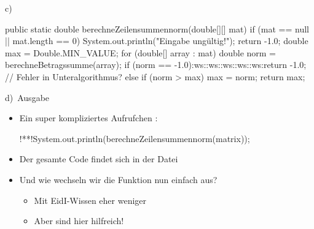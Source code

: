 \begin{frame}[fragile,c]{c)~}
\begin{plainjava}[lineskip=2pt]
public static double berechneZeilensummennorm(double[][] mat) {
    if (mat == null || mat.length == 0) {
        System.out.println("Eingabe ungültig!");
        return -1.0;
    }
    double max = Double.MIN_VALUE;
    for (double[] array : mat) {
        double norm = berechneBetragssumme(array);
        if (norm == -1.0):ws::ws::ws::ws::ws:return -1.0; // Fehler in Unteralgorithmus?
        else if (norm > max) max = norm;
    }
    return max;
}
\end{plainjava}
\end{frame}

\begin{frame}[fragile]{d)~Ausgabe}
\begin{itemize}[<+(1)->]
    \itemsep8pt
    \item Ein super kompliziertes Aufrufchen :
\begin{plainjava}[aboveskip=0pt]
!**!System.out.println(berechneZeilensummennorm(matrix));
\end{plainjava}
    \item<4-> Der gesamte Code findet sich in der Datei 
    \item Und wie wechseln wir die Funktion nun einfach aus? \begin{itemize}
        \item Mit EidI-Wissen eher weniger
        \item Aber  sind hier hilfreich!
    \end{itemize}
\end{itemize}
\end{frame}

